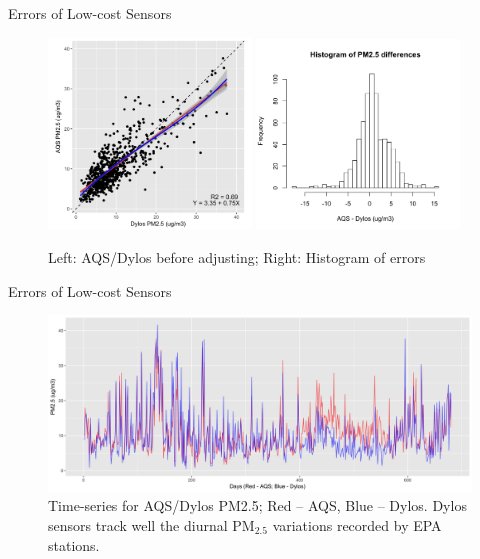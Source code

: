 \documentclass{beamer}
\begin{document}
\begin{frame}{Errors of Low-cost Sensors}
    \begin{figure}
        \centering
        \includegraphics[width=0.48\textwidth]{img/appendix/Aim2/scatter_reg.jpg}
        \includegraphics[width=0.48\textwidth]{img/appendix/Aim2/hist.png}
        \caption{Left: AQS/Dylos before adjusting; Right: Histogram of errors}
    \end{figure}
\end{frame}

\begin{frame}{Errors of Low-cost Sensors}
    \begin{figure}
        \centering
        \includegraphics[width=\textwidth]{img/appendix/Aim2/time_series.jpg}
        \caption{Time-series for AQS/Dylos PM2.5; \textcolor[rgb]{1,0,0}{Red} -- AQS, \textcolor[rgb]{0,0,1}{Blue} -- Dylos. Dylos sensors track well the diurnal PM$_{2.5}$ variations recorded by EPA stations.}
    \end{figure}
\end{frame}
\end{document}
